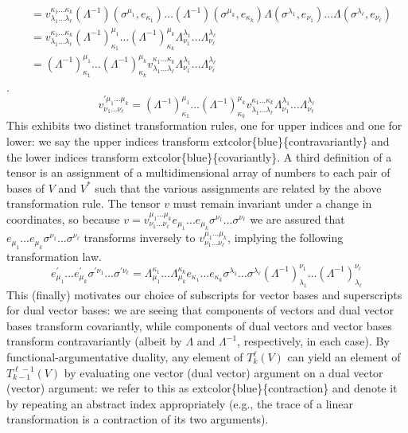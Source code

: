 \documentclass[
]{book}
\begin{document}
{\begin{align*}
  &= v_{\lambda_1\dots \lambda_\ell}^{\kappa_1\dots \kappa_k} (\Lambda^{-1})(\sigma^{\mu_1}, e_{\kappa_1}) \dots (\Lambda^{-1})(\sigma^{\mu_k}, e_{\kappa_k})\Lambda(\sigma^{\lambda_1}, e_{\nu_1}) \dots \Lambda(\sigma^{\lambda_\ell}, e_{\nu_\ell})\\
  &= v_{\lambda_1\dots \lambda_\ell}^{\kappa_1\dots \kappa_k} (\Lambda^{-1})^{\mu_1}_{\kappa_1} \dots (\Lambda^{-1})^{\mu_k}_{\kappa_k}\Lambda^{\lambda_1}_{\nu_1} \dots \Lambda^{\lambda_\ell}_{\nu_\ell}\\
  &= (\Lambda^{-1})^{\mu_1}_{\kappa_1} \dots (\Lambda^{-1})^{\mu_k}_{\kappa_k}v_{\lambda_1\dots \lambda_\ell}^{\kappa_1\dots \kappa_k} \Lambda^{\lambda_1}_{\nu_1} \dots \Lambda^{\lambda_\ell}_{\nu_\ell}
  \end{align*}}.
\begin{equation} 
    v_{\nu_1\dots \nu_\ell}^{\prime \mu_1\dots \mu_k} = (\Lambda^{-1})^{\mu_1}_{\kappa_1} \dots (\Lambda^{-1})^{\mu_k}_{\kappa_k}v_{\lambda_1\dots \lambda_\ell}^{\kappa_1 \dots \kappa_k} \Lambda^{\lambda_1}_{\nu_1} \dots \Lambda^{\lambda_\ell}_{\nu_\ell} 
\end{equation}
This exhibits two distinct transformation rules, one for upper indices and one for lower: we say the upper indices transform extcolor\{blue\}\{contravariantly\} and the lower indices transform extcolor\{blue\}\{covariantly\}. A third definition of a tensor is an assignment of a multidimensional array of numbers to each pair of bases of \(V\) and \(V^*\) such that the various assignments are related by the above transformation rule.
The tensor \(v\) must remain invariant under a change in coordinates, so because \(v = v_{\nu_1\dots \nu_\ell}^{\mu_1\dots \mu_k} e_{\mu_1} \dots e_{\mu_k} \sigma^{\nu_1} \dots \sigma^{\nu_\ell}\) we are assured that \(e_{\mu_1} \dots e_{\mu_k} \sigma^{\nu_1} \dots \sigma^{\nu_\ell}\) transforms inversely to \(v_{\nu_1\dots \nu_\ell}^{\mu_1\dots \mu_k}\), implying the following transformation law.
\begin{equation}
    e^\prime_{\mu_1} \dots e^\prime_{\mu_k} \sigma^{\prime\nu_1} \dots \sigma^{\prime\nu_\ell} = \Lambda_{\mu_1}^{\kappa_1} \dots \Lambda_{\mu_k}^{\kappa_k} e_{\kappa_1} \dots e_{\kappa_k} \sigma^{\lambda_1} \dots \sigma^{\lambda_\ell} (\Lambda^{-1})_{\lambda_1}^{\nu_1} \dots (\Lambda^{-1})_{\lambda_\ell}^{\nu_\ell}
\end{equation}
This (finally) motivates our choice of subscripts for vector bases and superscripts for dual vector bases: we are seeing that components of vectors and dual vector bases transform covariantly, while components of dual vectors and vector bases transform contravariantly (albeit by \(\Lambda\) and \(\Lambda^{-1}\), respectively, in each case).
By functional-argumentative duality, any element of \(T_k^\ell(V)\) can yield an element of \(T_{k-1}^{\ell-1}(V)\) by evaluating one vector (dual vector) argument on a dual vector (vector) argument: we refer to this as extcolor\{blue\}\{contraction\} and denote it by repeating an abstract index appropriately (e.g., the trace of a linear transformation is a contraction of its two arguments).
\end{document}
